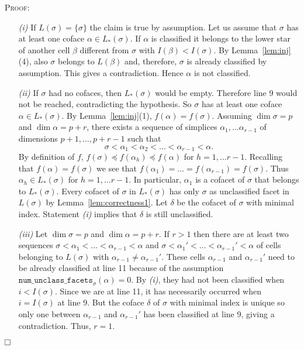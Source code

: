 \documentclass[12pt]{article}
\newenvironment{proof}{\noindent\textsc{Proof: }}{\hfill$\fbox{}$\par\medskip\par}
\begin{document}
\begin{proof}
\begin{enumerate}
\item[{\em (i)}] If $L(\sigma)=\{\sigma\}$ the claim is true by assumption. Let us assume that  $\sigma$ has at least one coface $\alpha \in L_*(\sigma)$.  If $\alpha$ is  classified  it  belongs to the lower star of another cell $\beta$ different from $\sigma$ with $I(\beta)<I(\sigma)$. By Lemma~\ref{lem:inj}(4), also $\sigma$ belongs to $L(\beta)$ and, therefore, $\sigma$ is already classified by assumption. This gives a contradiction. Hence $\alpha$ is not classified.

\item[{\em (ii)}] If $\sigma$ had no cofaces, then $L_*(\sigma)$ would be empty. Therefore line 9 would not be reached, contradicting the hypothesis. So $\sigma$ has at least one coface $\alpha \in L_*(\sigma)$. By Lemma~\ref{lem:inj}(1), $f(\alpha)=f(\sigma)$. Assuming $\dim \sigma = p$ and $\dim \alpha = p+r$, there exists a sequence of simplices $\alpha_1, \ldots \alpha_{r-1}$ of dimensions $p+1, \ldots, p+r-1$ such that
    $$\sigma < \alpha_1 < \alpha_2 < \ldots < \alpha_{r-1} < \alpha.$$
 By definition of $f$, $f(\sigma)\preceq f(\alpha_h)\preceq f(\alpha)$ for $h=1,\ldots r-1$. Recalling that $f(\alpha)=f(\sigma)$ we see that $f(\alpha_1) = \ldots = f(\alpha_{r-1}) = f(\sigma)$. Thus $\alpha_h\in L_*(\sigma)$ for $h=1,\ldots r-1$. In particular, $\alpha_1$ is a cofacet of $\sigma$ that belongs to $L_*(\sigma)$. Every cofacet of $\sigma$ in $L_*(\sigma)$ has only $\sigma$ as unclassified facet in $L(\sigma)$ by Lemma~\ref{lem:correctness1}. Let $\delta$ be the cofacet of $\sigma$ with minimal index. Statement {\em (i)} implies that $\delta$ is still unclassified.

\item[{\em (iii)}] Let $\dim\sigma=p$ and $\dim\alpha=p+r$. If $r>1$ then there are at least two sequences $\sigma<\alpha_1<\ldots <\alpha_{r-1}<\alpha$ and $\sigma<\alpha_1'<\ldots <\alpha_{r-1}'<\alpha$ of cells belonging to  $L(\sigma)$ with $\alpha_{r-1}\ne \alpha_{r-1}'$. These cells $\alpha_{r-1}$ and  $\alpha_{r-1}'$ need to be already classified at line 11 because of the assumption $\texttt{{num}\_{unclass}\_{facets}}_{\sigma} (\alpha)=0$.  By {\em (i)}, they had not been classified when $i<I(\sigma)$. Since we are at line 11, it has necessarily occurred when $i=I(\sigma)$ at line 9. But the coface $\delta$ of $\sigma$ with minimal index is unique so only one between $\alpha_{r-1}$ and  $\alpha_{r-1}'$ has been classified at line 9, giving a contradiction. Thus, $r=1$.
\end{enumerate}
\end{proof}
\end{document}
